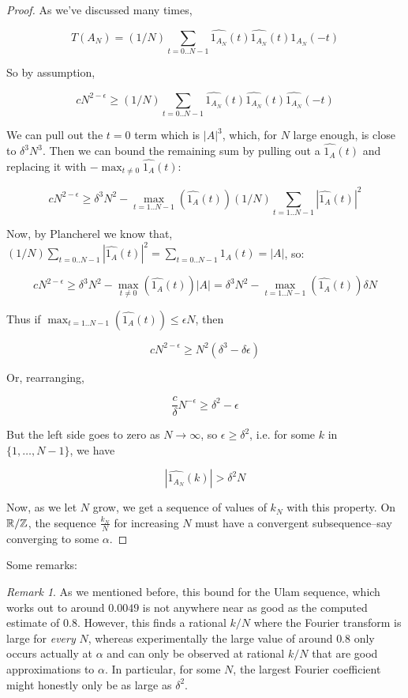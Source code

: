 \documentclass{article}
\theoremstyle{definition}
\theoremstyle{remark}
\newtheorem{remark}{Remark}
\numberwithin{equation}{section}
\begin{document}
\begin{proof}
  As we've discussed many times,

\[T(A_N) = (1/N) \sum_{t=0..N-1} \widehat{1_{A_N}}(t) \widehat{1_{A_N}}(t) \widehat{1_{A_N}}(-t)\]

So by assumption, 

\[cN^{2-\epsilon} \geq (1/N) \sum_{t=0..N-1} \widehat{1_{A_N}}(t) \widehat{1_{A_N}}(t) \widehat{1_{A_N}}(-t)\]

We can pull out the $t = 0$ term which is $|A|^3$, which, for $N$
large enough, is close to $\delta^3 N^3$.  Then we can bound the
remaining sum by pulling out a $\widehat{1_A}(t)$ and replacing it
with $-\max_{t\neq 0} \widehat{1_A}(t)$:

\[cN^{2-\epsilon} \geq \delta^3 N^2 - \max_{t=1..N-1}(\widehat{1_A}(t)) (1/N) \sum_{t=1..N-1} |\widehat{1_A}(t)|^2\]

Now, by Plancherel we know that,
$(1/N) \sum_{t=0..N-1} |\widehat{1_A}(t)|^2 = \sum_{t=0..N-1} 1_A(t) =
|A|$, so:

\[cN^{2-\epsilon} \geq \delta^3 N^2 - \max_{t\neq 0}(\widehat{1_A}(t))
|A| = \delta^3 N^2 - \max_{t=1..N-1}(\widehat{1_A}(t)) \delta N\]

Thus if $\max_{t=1..N-1}(\widehat{1_A}(t)) \leq \epsilon N$, then 

\[cN^{2-\epsilon} \geq N^2 (\delta^3 - \delta\epsilon)\]

Or, rearranging, 

\[\frac{c}{\delta} N^{-\epsilon} \geq \delta^2 - \epsilon\]

But the left side goes to zero as $N \to \infty$, so
$\epsilon \geq \delta^2$, i.e. for some $k$ in $\{1, \ldots, N-1\}$,
we have

\[|\widehat{1_{A_N}}(k)| > \delta^2 N\]

Now, as we let $N$ grow, we get a sequence of values of $k_N$ with
this property.  On $\mathbb{R}/\mathbb{Z}$, the sequence $\frac{k_N}{N}$ for
increasing $N$ must have a convergent subsequence--say converging to
some $\alpha$.  \end{proof}

Some remarks: 

\begin{remark}
  As we mentioned before, this bound for the Ulam sequence, which
  works out to around $0.0049$ is not anywhere near as good as the
  computed estimate of $0.8$.  However, this finds a rational $k/N$
  where the Fourier transform is large for \textit{every} $N$, whereas
  experimentally the large value of around $0.8$ only occurs actually
  at $\alpha$ and can only be observed at rational $k/N$ that are good
  approximations to $\alpha$.  In particular, for some $N$, the
  largest Fourier coefficient might honestly only be as large as
  $\delta^2$.
\end{remark}
\end{document}
